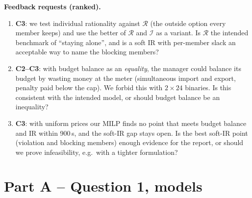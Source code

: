 \documentclass[10pt,a4paper]{article}
\newcommand{\cR}{\mathcal{R}}
\newcommand{\cI}{\mathcal{I}}
\newcommand{\qitem}[2]{\par\smallskip\noindent{\color{dtured}\textbf{#1}}\enspace\textbf{#2}\par\nopagebreak}
\begin{document}
\qitem{0.2}{Feedback requests (ranked).}
\begin{enumerate}[label=\arabic*.]
  \item \textbf{C3}: we test individual rationality against $\cR$ (the outside option every member keeps) and use the better of $\cR$ and $\cI$ as a variant. Is $\cR$ the intended benchmark of ``staying alone'', and is a soft IR with per-member slack an acceptable way to name the blocking members?
  \item \textbf{C2--C3}: with budget balance as an \emph{equality}, the manager could balance its budget by wasting money at the meter (simultaneous import and export, penalty paid below the cap). We forbid this with $2\times 24$ binaries. Is this consistent with the intended model, or should budget balance be an inequality?
  \item \textbf{C3}: with uniform prices our MILP finds no point that meets budget balance and IR within 900\,s, and the soft-IR gap stays open. Is the best soft-IR point (violation and blocking members) enough evidence for the report, or should we prove infeasibility, e.g.\ with a tighter formulation?
\end{enumerate}

\section*{Part A -- Question 1, models}
\end{document}
